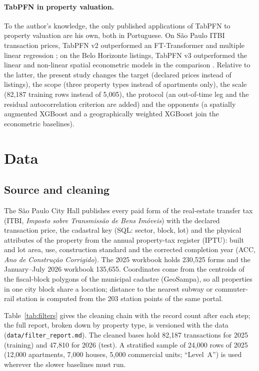 \documentclass[11pt,a4paper]{article}
\begin{document}
\paragraph{TabPFN in property valuation.} To the author's knowledge, the only published
applications of TabPFN to property valuation are his own, both in Portuguese. On São Paulo
ITBI transaction prices, TabPFN v2 outperformed an FT-Transformer and multiple linear
regression \citep{benvenho2026igel}; on the Belo Horizonte listings, TabPFN v3 outperformed the
linear and non-linear spatial econometric models in the comparison \citep{benvenho2026cead}.
Relative to the latter, the present study changes the target (declared prices instead of
listings), the scope (three property types instead of apartments only), the scale (82{,}187
training rows instead of 5{,}005), the protocol (an out-of-time leg and the residual
autocorrelation criterion are added) and the opponents (a spatially augmented XGBoost and a
geographically weighted XGBoost join the econometric baselines).

\section{Data}
\label{sec:data}

\subsection{Source and cleaning}

The São Paulo City Hall publishes every paid form of the real-estate transfer tax (ITBI,
\emph{Imposto sobre Transmissão de Bens Imóveis}) with the declared transaction price, the
cadastral key (SQL: sector, block, lot) and the physical attributes of the property from the
annual property-tax register (IPTU): built and lot area, use, construction standard and the corrected
completion year (ACC, \emph{Ano de Constru\c{c}\~ao Corrigido}). The 2025 workbook holds 230{,}525 forms and the January--July 2026 workbook
135{,}655. Coordinates come from the centroids of the fiscal-block polygons of the municipal
cadastre (GeoSampa), so all properties in one city block share a location; distance to the
nearest subway or commuter-rail station is computed from the 203 station points of the same
portal.

Table~\ref{tab:filters} gives the cleaning chain with the record count after each step; the full
report, broken down by property type, is versioned with the data
(\texttt{data/filter\_report.md}). The cleaned bases hold 82{,}187 transactions for 2025
(training) and 47{,}810 for 2026 (test). A stratified sample of 24{,}000 rows of 2025 (12{,}000
apartments, 7{,}000 houses, 5{,}000 commercial units; ``Level~A'') is used wherever the slower
baselines must run.
\end{document}
